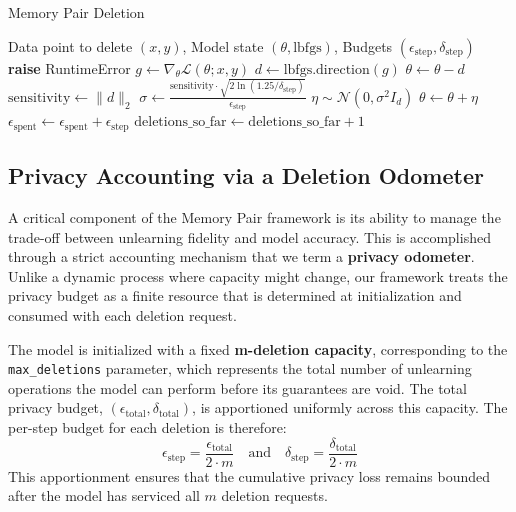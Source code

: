 \documentclass[a4paper,12pt]{article}
\begin{document}
\begin{algorithm}
\caption{Memory Pair Deletion}\label{alg:deletion}
\begin{algorithmic}
\Require Data point to delete $(x, y)$, Model state $(\theta, \text{lbfgs})$, Budgets $(\epsilon_{\text{step}}, \delta_{\text{step}})$
\State \textbf{raise} RuntimeError
\EndIf
\State
\State $g \gets \nabla_{\theta} \mathcal{L}(\theta; x, y)$
\State $d \gets \text{lbfgs.direction}(g)$
\State $\theta \gets \theta - d$
\State
\State $\text{sensitivity} \gets \|d\|_2$
\State $\sigma \gets \frac{\text{sensitivity} \cdot \sqrt{2 \ln(1.25 / \delta_{\text{step}})}}{\epsilon_{\text{step}}}$
\State $\eta \sim \mathcal{N}(0, \sigma^2 I_d)$
\State $\theta \gets \theta + \eta$
\State
\State $\epsilon_{\text{spent}} \gets \epsilon_{\text{spent}} + \epsilon_{\text{step}}$
\State $\text{deletions\_so\_far} \gets \text{deletions\_so\_far} + 1$

\end{algorithmic}
\end{algorithm}

\subsection{Privacy Accounting via a Deletion Odometer}

A critical component of the Memory Pair framework is its ability to manage the trade-off between unlearning fidelity and model accuracy. This is accomplished through a strict accounting mechanism that we term a \textbf{privacy odometer}. Unlike a dynamic process where capacity might change, our framework treats the privacy budget as a finite resource that is determined at initialization and consumed with each deletion request.

The model is initialized with a fixed \textbf{m-deletion capacity}, corresponding to the \texttt{max\_deletions} parameter, which represents the total number of unlearning operations the model can perform before its guarantees are void. The total privacy budget, $(\epsilon_{\text{total}}, \delta_{\text{total}})$, is apportioned uniformly across this capacity. The per-step budget for each deletion is therefore:
$$
\epsilon_{\text{step}} = \frac{\epsilon_{\text{total}}}{2 \cdot m} \quad \text{and} \quad \delta_{\text{step}} = \frac{\delta_{\text{total}}}{2 \cdot m}
$$
This apportionment ensures that the cumulative privacy loss remains bounded after the model has serviced all $m$ deletion requests.
\end{document}
